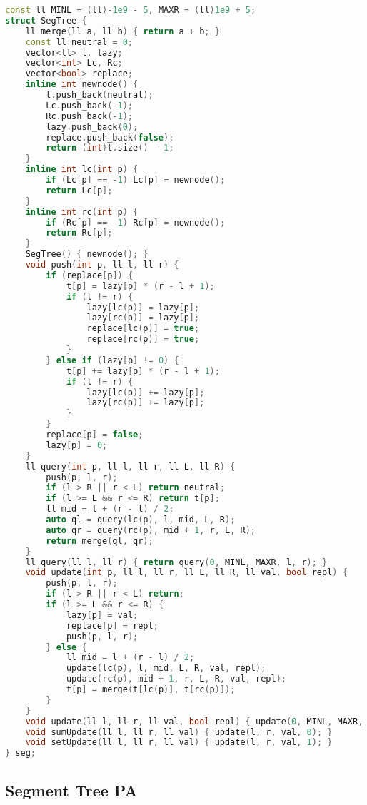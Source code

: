 \documentclass[10pt, a4paper, oneside]{book}
\begin{document}
\begin{lstlisting}[language=C++]
const ll MINL = (ll)-1e9 - 5, MAXR = (ll)1e9 + 5;
struct SegTree {
    ll merge(ll a, ll b) { return a + b; }
    const ll neutral = 0;
    vector<ll> t, lazy;
    vector<int> Lc, Rc;
    vector<bool> replace;
    inline int newnode() {
        t.push_back(neutral);
        Lc.push_back(-1);
        Rc.push_back(-1);
        lazy.push_back(0);
        replace.push_back(false);
        return (int)t.size() - 1;
    }
    inline int lc(int p) {
        if (Lc[p] == -1) Lc[p] = newnode();
        return Lc[p];
    }
    inline int rc(int p) {
        if (Rc[p] == -1) Rc[p] = newnode();
        return Rc[p];
    }
    SegTree() { newnode(); }
    void push(int p, ll l, ll r) {
        if (replace[p]) {
            t[p] = lazy[p] * (r - l + 1);
            if (l != r) {
                lazy[lc(p)] = lazy[p];
                lazy[rc(p)] = lazy[p];
                replace[lc(p)] = true;
                replace[rc(p)] = true;
            }
        } else if (lazy[p] != 0) {
            t[p] += lazy[p] * (r - l + 1);
            if (l != r) {
                lazy[lc(p)] += lazy[p];
                lazy[rc(p)] += lazy[p];
            }
        }
        replace[p] = false;
        lazy[p] = 0;
    }
    ll query(int p, ll l, ll r, ll L, ll R) {
        push(p, l, r);
        if (l > R || r < L) return neutral;
        if (l >= L && r <= R) return t[p];
        ll mid = l + (r - l) / 2;
        auto ql = query(lc(p), l, mid, L, R);
        auto qr = query(rc(p), mid + 1, r, L, R);
        return merge(ql, qr);
    }
    ll query(ll l, ll r) { return query(0, MINL, MAXR, l, r); }
    void update(int p, ll l, ll r, ll L, ll R, ll val, bool repl) {
        push(p, l, r);
        if (l > R || r < L) return;
        if (l >= L && r <= R) {
            lazy[p] = val;
            replace[p] = repl;
            push(p, l, r);
        } else {
            ll mid = l + (r - l) / 2;
            update(lc(p), l, mid, L, R, val, repl);
            update(rc(p), mid + 1, r, L, R, val, repl);
            t[p] = merge(t[lc(p)], t[rc(p)]);
        }
    }
    void update(ll l, ll r, ll val, bool repl) { update(0, MINL, MAXR, l, r, val, repl); }
    void sumUpdate(ll l, ll r, ll val) { update(l, r, val, 0); }
    void setUpdate(ll l, ll r, ll val) { update(l, r, val, 1); }
} seg;
\end{lstlisting}
\hfill

\subsection{Segment Tree PA}
\end{document}
